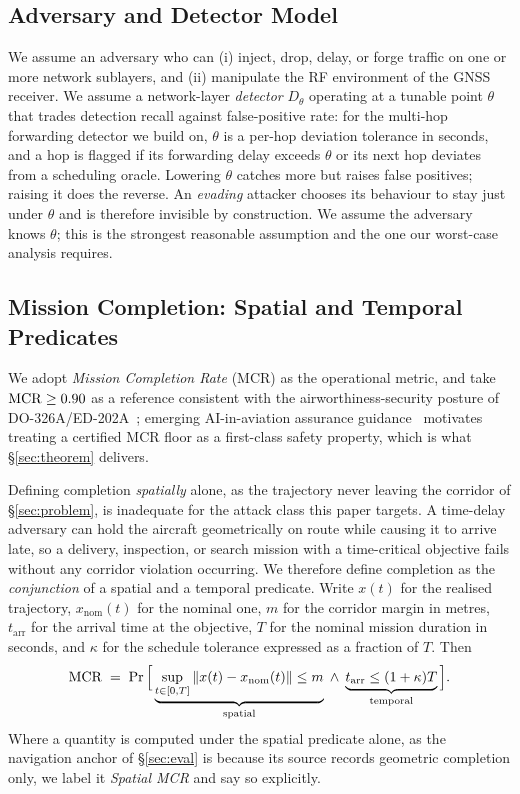 \subsection{Adversary and Detector Model}
We assume an adversary who can (i) inject, drop, delay, or forge traffic on one
or more network sublayers, and (ii) manipulate the RF environment of the GNSS
receiver. We assume a network-layer \emph{detector} $D_\theta$ operating at a
tunable point $\theta$ that trades detection recall against false-positive rate:
for the multi-hop forwarding detector we build on, $\theta$ is a per-hop
deviation tolerance in seconds, and a hop is flagged if its forwarding delay
exceeds $\theta$ or its next hop deviates from a scheduling oracle. Lowering
$\theta$ catches more but raises false positives; raising it does the reverse.
An \emph{evading} attacker chooses its behaviour to stay just under $\theta$ and
is therefore invisible by construction. We assume the adversary knows $\theta$;
this is the strongest reasonable assumption and the one our worst-case analysis
requires.

\subsection{Mission Completion: Spatial and Temporal Predicates}
\label{sec:mcr}
We adopt \emph{Mission Completion Rate} (MCR) as the operational metric, and
take $\mathrm{MCR}\ge0.90$ as a reference consistent with the airworthiness-security
posture of DO-326A/ED-202A~\cite{do326a}; emerging AI-in-aviation assurance
guidance~\cite{ed324} motivates treating a certified MCR floor as a first-class
safety property, which is what \S\ref{sec:theorem} delivers.

Defining completion \emph{spatially} alone, as the trajectory never leaving the
corridor of \S\ref{sec:problem}, is inadequate for the attack class this paper
targets. A time-delay adversary can hold the aircraft geometrically on route
while causing it to arrive late, so a delivery, inspection, or search mission
with a time-critical objective fails without any corridor violation occurring.
We therefore define completion as the \emph{conjunction} of a spatial and a
temporal predicate. Write $x(t)$ for the realised trajectory,
$x_{\mathrm{nom}}(t)$ for the nominal one, $m$ for the corridor margin in
metres, $t_{\mathrm{arr}}$ for the arrival time at the objective, $T$ for the
nominal mission duration in seconds, and $\kappa$ for the schedule tolerance
expressed as a fraction of $T$. Then
\begin{equation}
\label{eq:mcr}
\mathrm{MCR} \;=\; \Pr\Big[\underbrace{\sup_{t\in[0,T]}\left\lVert x(t)-x_{\mathrm{nom}}(t)\right\rVert\le m}_{\text{spatial}}
\;\wedge\;
\underbrace{t_{\mathrm{arr}}\le(1+\kappa)T}_{\text{temporal}}\Big].
\end{equation}
Where a quantity is computed under the spatial predicate alone, as the
navigation anchor of \S\ref{sec:eval} is because its source records geometric
completion only, we label it \emph{Spatial MCR} and say so explicitly.

